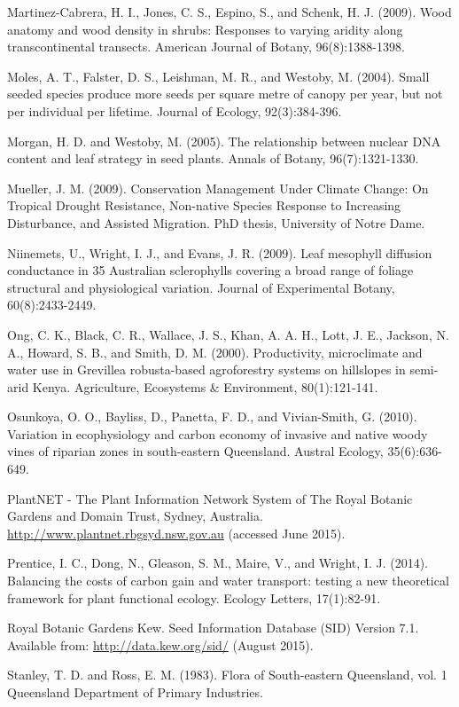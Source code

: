 \documentclass[openright,12pt,a4paper]{memoir}
\begin{document}
Martinez-Cabrera, H. I., Jones, C. S., Espino, S., and Schenk, H. J. (2009). Wood anatomy and wood density in shrubs: Responses to varying aridity along transcontinental transects. 
American Journal of Botany, 96(8):1388-1398.

Moles, A. T., Falster, D. S., Leishman, M. R., and Westoby, M. (2004). Small seeded species produce more seeds per square metre of canopy per year, but not per individual per lifetime. Journal of Ecology, 92(3):384-396.

Morgan, H. D. and Westoby, M. (2005). The relationship between nuclear DNA content and leaf strategy in seed plants. Annals of Botany, 96(7):1321-1330.

Mueller, J. M. (2009). Conservation Management Under Climate Change: On Tropical Drought Resistance, Non-native Species Response to Increasing Disturbance, and Assisted Migration. PhD thesis, University of Notre Dame.

Niinemets, U., Wright, I. J., and Evans, J. R. (2009). Leaf mesophyll diffusion conductance in 35 Australian sclerophylls covering a broad range of foliage structural and physiological variation. Journal of Experimental Botany, 60(8):2433-2449.

Ong, C. K., Black, C. R., Wallace, J. S., Khan, A. A. H., Lott, J. E., Jackson, N. A., Howard, S. B., and Smith, D. M. (2000). Productivity, microclimate and water use in Grevillea robusta-based agroforestry systems on hillslopes in semi-arid Kenya. Agriculture, Ecosystems \& Environment, 80(1):121-141.

Osunkoya, O. O., Bayliss, D., Panetta, F. D., and Vivian-Smith, G. (2010). Variation in ecophysiology and carbon economy of invasive and native woody vines of riparian zones in south-eastern Queensland. Austral Ecology, 35(6):636-649.

PlantNET - The Plant Information Network System of The Royal Botanic Gardens and Domain Trust, Sydney, Australia. \url{http://www.plantnet.rbgsyd.nsw.gov.au} (accessed June 2015).

Prentice, I. C., Dong, N., Gleason, S. M., Maire, V., and Wright, I. J. (2014). Balancing the costs of carbon gain and water transport: testing a new theoretical framework for plant functional ecology. Ecology Letters, 17(1):82-91.

Royal Botanic Gardens Kew. Seed Information Database (SID) Version 7.1. Available from: \url{http://data.kew.org/sid/} (August 2015).

Stanley, T. D. and Ross, E. M. (1983). Flora of South-eastern Queensland, vol. 1 Queensland Department of Primary Industries.
\end{document}

